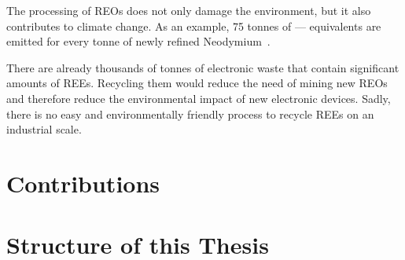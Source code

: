 The processing of REOs does not only damage the environment, but it also contributes to climate change.
As an example, 75 tonnes of — equivalents are emitted for every tonne of newly refined Neodymium~\cite{reeclimate}.

There are already thousands of tonnes of electronic waste that contain significant amounts of REEs. Recycling them would reduce the need of mining new REOs and therefore reduce the environmental impact of new electronic devices.
Sadly, there is no easy and environmentally friendly process to recycle REEs on an industrial scale.


\section{Contributions\authorB{}}


\section{Structure of this Thesis\authorB{}}


